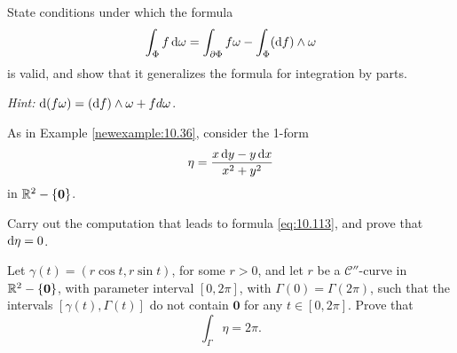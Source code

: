 \begin{myexercise}    
    \label{ex:10.20}
    State conditions under which the formula
    \begin{equation*}
        \int_{\Phi} f \d \omega = 
        \int_{\partial\Phi} f \omega -
        \int_{\Phi} (\d f) \wedge \omega 
    \end{equation*}
    is valid, and show that it generalizes the formula for integration by parts.

    \emph{Hint:} $\d(f \omega) = (\d f) \wedge \omega + f d\omega$.
\end{myexercise}


\begin{myexercise}    
    \label{ex:10.21}
    As in Example \ref{newexample:10.36}, consider the 1-form
    \begin{equation*}
        \eta = \frac{x \d y - y \d x}{x^2+y^2}
    \end{equation*}
    in ${\protect\mathbb R}^2 - \{\mathbf{0}\}$.
    \begin{asparaenum}[(a)]
        \item Carry out the computation that leads to formula \eqref{eq:10.113}, and prove that $\d \eta = 0$.
        \item Let $\gamma(t) = (r \cos t, r \sin t)$, for some $r > 0$, 
        and let $r$ be a $\mathscr{C}''$-curve in ${\protect\mathbb R}^2 - \{\mathbf{0}\}$, 
        with parameter interval $[0, 2\pi]$, with $\Gamma(0) = \Gamma(2\pi)$, such that the intervals $[\gamma(t), \Gamma(t)]$ do not contain $\mathbf{0}$ for any $t \in $$[0, 2\pi]$. Prove that
        \begin{equation*}
            \int_{\Gamma} \eta = 2 \pi .
        \end{equation*}
        

\end{asparaenum}
\end{myexercise}
